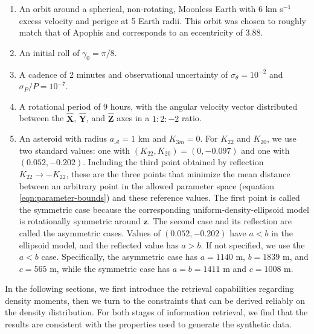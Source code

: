 \documentclass[fleqn,usenatbib]{mnras}
\renewcommand{\unit}[1]{\bm{\hat{#1}}}
\begin{document}
\begin{enumerate}
  \item An orbit around a spherical, non-rotating, Moonless Earth with $6$ km s$^{-1}$ excess velocity and perigee at 5 Earth radii. This orbit was chosen to roughly match that of Apophis and corresponds to an eccentricity of 3.88. 
  \item An initial roll of $\gamma_0=\pi/8$.
  \item A cadence of 2 minutes and observational uncertainty of $\sigma_\theta = 10^{-2}$ and $\sigma_P / P = 10^{-7}$.
  \item A rotational period of 9 hours, with the angular velocity vector distributed between the $\unit X$, $\unit Y$, and $\unit Z$ axes in a $1:2:-2$ ratio.
  \item An asteroid with radius $a_\mathcal{A} = 1$ km and $K_{3m}=0$. For $K_{22}$ and $K_{20}$, we use two standard values: one with $(K_{22}, K_{20}) = (0, -0.097)$ and one with $(0.052, -0.202)$. Including the third point obtained by reflection $K_{22}\rightarrow -K_{22}$, these are the three points that minimize the mean distance between an arbitrary point in the allowed parameter space (equation \ref{eqn:parameter-bounds}) and these reference values. The first point is called the symmetric case because the corresponding uniform-density-ellipsoid model is rotationally symmetric around $\unit z$. The second case and its reflection are called the asymmetric cases. Values of $(0.052, -0.202)$ have $a < b$ in the ellipsoid model, and the reflected value has $a > b$. If not specified, we use the $a < b$ case. Specifically, the asymmetric case has $a=1140$ m, $b=1839$ m, and $c=565$ m, while the symmetric case has $a=b=1411$ m and $c=1008$ m.
\end{enumerate}

In the following sections, we first introduce the retrieval capabilities regarding density moments, then we turn to the constraints that can be derived reliably on the density distribution. For both stages of information retrieval, we find that the results are consistent with the properties used to generate the synthetic data.
\end{document}
